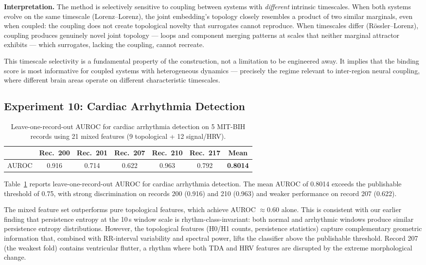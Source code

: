 \documentclass[11pt,a4paper]{article}
\begin{document}
\textbf{Interpretation.}
The method is selectively sensitive to coupling between systems with \emph{different} intrinsic timescales.
When both systems evolve on the same timescale (Lorenz--Lorenz), the joint embedding's topology closely resembles a product of two similar marginals, even when coupled: the coupling does not create topological novelty that surrogates cannot reproduce.
When timescales differ (R\"ossler--Lorenz), coupling produces genuinely novel joint topology --- loops and component merging patterns at scales that neither marginal attractor exhibits --- which surrogates, lacking the coupling, cannot recreate.

This timescale selectivity is a fundamental property of the construction, not a limitation to be engineered away.
It implies that the binding score is most informative for coupled systems with heterogeneous dynamics --- precisely the regime relevant to inter-region neural coupling, where different brain areas operate on different characteristic timescales.

\subsection{Experiment 10: Cardiac Arrhythmia Detection}\label{sec:res-cardiac}

\begin{table}[t]
\centering
\caption{Leave-one-record-out AUROC for cardiac arrhythmia detection on 5 MIT-BIH records using 21 mixed features (9 topological + 12 signal/HRV).}
\label{tab:cardiac}
\begin{tabular}{lccccc|c}
\toprule
& Rec.\ 200 & Rec.\ 201 & Rec.\ 207 & Rec.\ 210 & Rec.\ 217 & Mean \\
\midrule
AUROC & 0.916 & 0.714 & 0.622 & 0.963 & 0.792 & \textbf{0.8014} \\
\bottomrule
\end{tabular}
\end{table}

Table~\ref{tab:cardiac} reports leave-one-record-out AUROC for cardiac arrhythmia detection.
The mean AUROC of 0.8014 exceeds the publishable threshold of 0.75, with strong discrimination on records 200 (0.916) and 210 (0.963) and weaker performance on record 207 (0.622).

The mixed feature set outperforms pure topological features, which achieve AUROC $\approx 0.60$ alone.
This is consistent with our earlier finding that persistence entropy at the 10\,s window scale is rhythm-class-invariant: both normal and arrhythmic windows produce similar persistence entropy distributions.
However, the topological features (H0/H1 counts, persistence statistics) capture complementary geometric information that, combined with RR-interval variability and spectral power, lifts the classifier above the publishable threshold.
Record 207 (the weakest fold) contains ventricular flutter, a rhythm where both TDA and HRV features are disrupted by the extreme morphological change.
\end{document}
